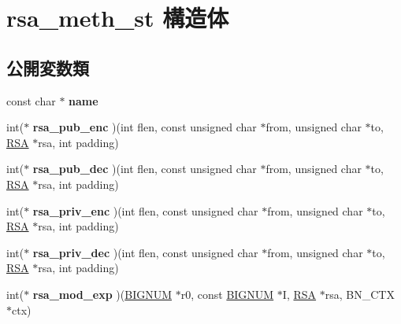 \hypertarget{structrsa__meth__st}{}\section{rsa\+\_\+meth\+\_\+st 構造体}
\label{structrsa__meth__st}
\subsection*{公開変数類}
\begin{DoxyCompactItemize}
\item 
\hypertarget{structrsa__meth__st_a7ce6d4139c1e9e8b220d2d3b3f240a14}{}const char $\ast$ {\bfseries name}\label{structrsa__meth__st_a7ce6d4139c1e9e8b220d2d3b3f240a14}

\item 
\hypertarget{structrsa__meth__st_a6ff51f7f2fd9b5b7e16a30616301caa7}{}int($\ast$ {\bfseries rsa\+\_\+pub\+\_\+enc} )(int flen, const unsigned char $\ast$from, unsigned char $\ast$to, \hyperlink{structrsa__st}{R\+S\+A} $\ast$rsa, int padding)\label{structrsa__meth__st_a6ff51f7f2fd9b5b7e16a30616301caa7}

\item 
\hypertarget{structrsa__meth__st_a4eb63fb1e1abbe10f8cd81c1efef8cf4}{}int($\ast$ {\bfseries rsa\+\_\+pub\+\_\+dec} )(int flen, const unsigned char $\ast$from, unsigned char $\ast$to, \hyperlink{structrsa__st}{R\+S\+A} $\ast$rsa, int padding)\label{structrsa__meth__st_a4eb63fb1e1abbe10f8cd81c1efef8cf4}

\item 
\hypertarget{structrsa__meth__st_abb623f4c63d15a39af63ec2ead7cf803}{}int($\ast$ {\bfseries rsa\+\_\+priv\+\_\+enc} )(int flen, const unsigned char $\ast$from, unsigned char $\ast$to, \hyperlink{structrsa__st}{R\+S\+A} $\ast$rsa, int padding)\label{structrsa__meth__st_abb623f4c63d15a39af63ec2ead7cf803}

\item 
\hypertarget{structrsa__meth__st_a0a9fcf9d1e4799ab69233c2187921fe1}{}int($\ast$ {\bfseries rsa\+\_\+priv\+\_\+dec} )(int flen, const unsigned char $\ast$from, unsigned char $\ast$to, \hyperlink{structrsa__st}{R\+S\+A} $\ast$rsa, int padding)\label{structrsa__meth__st_a0a9fcf9d1e4799ab69233c2187921fe1}

\item 
\hypertarget{structrsa__meth__st_a055a4194b3a73d653111656553b2ae8c}{}int($\ast$ {\bfseries rsa\+\_\+mod\+\_\+exp} )(\hyperlink{structbignum__st}{B\+I\+G\+N\+U\+M} $\ast$r0, const \hyperlink{structbignum__st}{B\+I\+G\+N\+U\+M} $\ast$I, \hyperlink{structrsa__st}{R\+S\+A} $\ast$rsa, B\+N\+\_\+\+C\+T\+X $\ast$ctx)\label{structrsa__meth__st_a055a4194b3a73d653111656553b2ae8c}


\end{DoxyCompactItemize}
